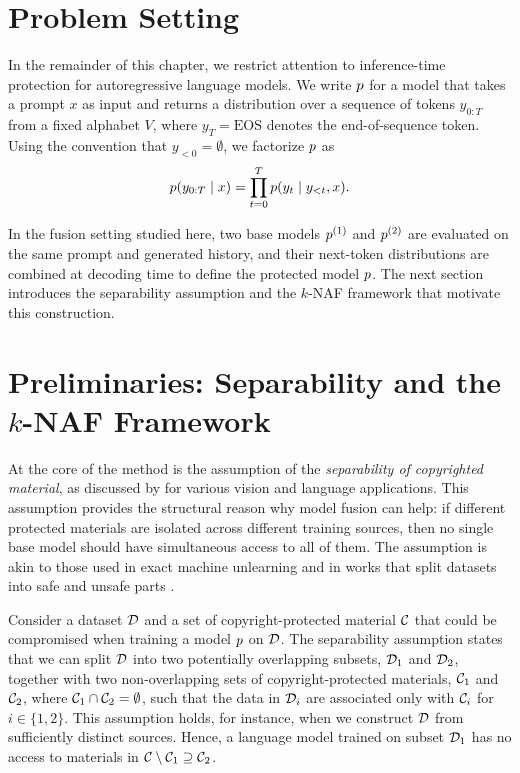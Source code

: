 \section{Problem Setting}

In the remainder of this chapter, we restrict attention to inference-time protection for autoregressive language models. We write \(p\) for a model that takes a prompt \(x\) as input and returns a distribution over a sequence of tokens \(y_{0:T}\) from a fixed alphabet \(V\), where \(y_T = \mathrm{EOS}\) denotes the end-of-sequence token. Using the convention that \(y_{<0} = \emptyset\), we factorize \(p\) as
\[
p(y_{0:T}\mid x) = \prod_{t=0}^T p(y_t \mid y_{<t},x).
\]

In the fusion setting studied here, two base models \(p^{(1)}\) and \(p^{(2)}\) are evaluated on the same prompt and generated history, and their next-token distributions are combined at decoding time to define the protected model \(p\). The next section introduces the separability assumption and the \(k\)-NAF framework that motivate this construction.

\section{Preliminaries: Separability and the \texorpdfstring{$k$-NAF}{k-NAF} Framework}
\label{sec:cpfuse-preliminaries}

At the core of the method is the assumption of the \emph{separability of copyrighted material}, as discussed by \citet{vyas2023provable} for various vision and language applications. This assumption provides the structural reason why model fusion can help: if different protected materials are isolated across different training sources, then no single base model should have simultaneous access to all of them. The assumption is akin to those used in exact machine unlearning \citep{bourtoule2021machine,yan2022arcane,dukler2023safe} and in works that split datasets into safe and unsafe parts \citep{golatkar2021mixed,golatkar2024cpr,li2024purifying}.

Consider a dataset \(\mathcal D\) and a set of copyright-protected material \(\mathcal C\) that could be compromised when training a model \(p\) on \(\mathcal D\). The separability assumption states that we can split \(\mathcal D\) into two potentially overlapping subsets, \(\mathcal D_1\) and \(\mathcal D_2\), together with two non-overlapping sets of copyright-protected materials, \(\mathcal C_1\) and \(\mathcal C_2\), where \(\mathcal C_1 \cap \mathcal C_2 = \emptyset\), such that the data in \(\mathcal D_i\) are associated only with \(\mathcal C_i\) for \(i \in \{1,2\}\). This assumption holds, for instance, when we construct \(\mathcal D\) from sufficiently distinct sources. Hence, a language model trained on subset \(\mathcal D_1\) has no access to materials in \(\mathcal C \setminus \mathcal C_1 \supseteq \mathcal C_2\).

